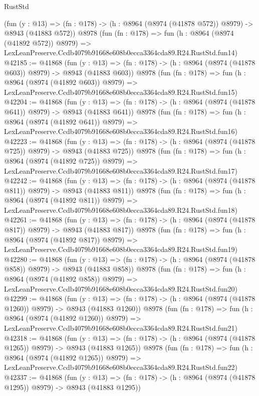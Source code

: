 \begin{lexlean}{RustStd}
\begin{coremodule}
    (fun (y : @13) => (fn : @178) -> (h : @8964 (@8974 (@41878 @572)) @8979) -> @8943 (@41883 @572))
    @8978
    (fun (fn : @178) =>
    fun (h : @8964 (@8974 (@41892 @572)) @8979) =>
    LexLeanPreserve.Ccdb4079b91668e608b0ecca3364cda89.R24.RustStd.fun14)
@42185 := @41868
    (fun (y : @13) => (fn : @178) -> (h : @8964 (@8974 (@41878 @603)) @8979) -> @8943 (@41883 @603))
    @8978
    (fun (fn : @178) =>
    fun (h : @8964 (@8974 (@41892 @603)) @8979) =>
    LexLeanPreserve.Ccdb4079b91668e608b0ecca3364cda89.R24.RustStd.fun15)
@42204 := @41868
    (fun (y : @13) => (fn : @178) -> (h : @8964 (@8974 (@41878 @641)) @8979) -> @8943 (@41883 @641))
    @8978
    (fun (fn : @178) =>
    fun (h : @8964 (@8974 (@41892 @641)) @8979) =>
    LexLeanPreserve.Ccdb4079b91668e608b0ecca3364cda89.R24.RustStd.fun16)
@42223 := @41868
    (fun (y : @13) => (fn : @178) -> (h : @8964 (@8974 (@41878 @725)) @8979) -> @8943 (@41883 @725))
    @8978
    (fun (fn : @178) =>
    fun (h : @8964 (@8974 (@41892 @725)) @8979) =>
    LexLeanPreserve.Ccdb4079b91668e608b0ecca3364cda89.R24.RustStd.fun17)
@42242 := @41868
    (fun (y : @13) => (fn : @178) -> (h : @8964 (@8974 (@41878 @811)) @8979) -> @8943 (@41883 @811))
    @8978
    (fun (fn : @178) =>
    fun (h : @8964 (@8974 (@41892 @811)) @8979) =>
    LexLeanPreserve.Ccdb4079b91668e608b0ecca3364cda89.R24.RustStd.fun18)
@42261 := @41868
    (fun (y : @13) => (fn : @178) -> (h : @8964 (@8974 (@41878 @817)) @8979) -> @8943 (@41883 @817))
    @8978
    (fun (fn : @178) =>
    fun (h : @8964 (@8974 (@41892 @817)) @8979) =>
    LexLeanPreserve.Ccdb4079b91668e608b0ecca3364cda89.R24.RustStd.fun19)
@42280 := @41868
    (fun (y : @13) => (fn : @178) -> (h : @8964 (@8974 (@41878 @858)) @8979) -> @8943 (@41883 @858))
    @8978
    (fun (fn : @178) =>
    fun (h : @8964 (@8974 (@41892 @858)) @8979) =>
    LexLeanPreserve.Ccdb4079b91668e608b0ecca3364cda89.R24.RustStd.fun20)
@42299 := @41868
    (fun (y : @13) =>
    (fn : @178) -> (h : @8964 (@8974 (@41878 @1260)) @8979) -> @8943 (@41883 @1260))
    @8978
    (fun (fn : @178) =>
    fun (h : @8964 (@8974 (@41892 @1260)) @8979) =>
    LexLeanPreserve.Ccdb4079b91668e608b0ecca3364cda89.R24.RustStd.fun21)
@42318 := @41868
    (fun (y : @13) =>
    (fn : @178) -> (h : @8964 (@8974 (@41878 @1265)) @8979) -> @8943 (@41883 @1265))
    @8978
    (fun (fn : @178) =>
    fun (h : @8964 (@8974 (@41892 @1265)) @8979) =>
    LexLeanPreserve.Ccdb4079b91668e608b0ecca3364cda89.R24.RustStd.fun22)
@42337 := @41868
    (fun (y : @13) =>
    (fn : @178) -> (h : @8964 (@8974 (@41878 @1295)) @8979) -> @8943 (@41883 @1295))

\end{coremodule}
\end{lexlean}

